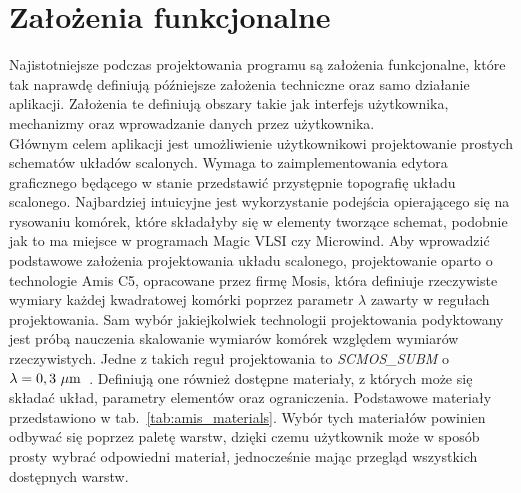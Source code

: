 \section{Założenia funkcjonalne}
\label{sec:zalozenia_funkcjonalne}

Najistotniejsze podczas projektowania programu są założenia funkcjonalne,
które tak naprawdę definiują późniejsze założenia techniczne oraz samo działanie aplikacji.
Założenia te definiują obszary takie jak interfejs użytkownika, mechanizmy oraz wprowadzanie danych przez użytkownika.\\
\indent Głównym celem aplikacji jest umożliwienie użytkownikowi projektowanie prostych schematów układów scalonych.
Wymaga to zaimplementowania edytora graficznego będącego w stanie przedstawić przystępnie topografię układu scalonego.
Najbardziej intuicyjne jest wykorzystanie podejścia opierającego się na rysowaniu komórek,
które składałyby się w elementy tworzące schemat, podobnie jak to ma miejsce w programach Magic VLSI czy Microwind.
Aby wprowadzić podstawowe założenia projektowania układu scalonego, projektowanie oparto o technologie Amis C5,
opracowane przez firmę Mosis,
która definiuje rzeczywiste wymiary każdej kwadratowej komórki poprzez parametr $\lambda$
zawarty w regułach projektowania.
Sam wybór jakiejkolwiek technologii projektowania podyktowany
jest próbą nauczenia skalowanie wymiarów komórek względem wymiarów rzeczywistych.
Jedne z takich reguł projektowania to \textit{SCMOS\_SUBM} o $\lambda=0,3~\text{$\mu$m}$~\cite{amis_c5, amis_params}.
Definiują one również dostępne materiały, z których może się składać układ, parametry elementów oraz ograniczenia.
Podstawowe materiały przedstawiono w tab.~\ref{tab:amis_materials}.
Wybór tych materiałów powinien odbywać się poprzez paletę warstw,
dzięki czemu użytkownik może w sposób prosty wybrać odpowiedni materiał,
jednocześnie mając przegląd wszystkich dostępnych warstw. 

